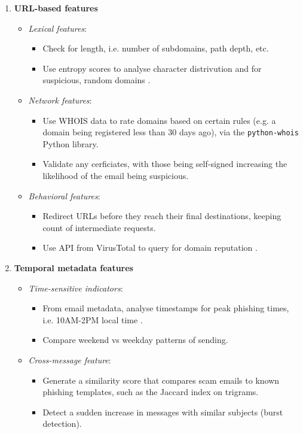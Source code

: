 \begin{enumerate}
\begin{itemize}
\begin{itemize}
    \end{itemize}
  \end{itemize}
  \item \textbf{URL-based features}
  \begin{itemize}
    \item \textit{Lexical features}:
    \begin{itemize}
      \item Check for length, i.e. number of subdomains, path depth, etc.
      \item Use entropy scores to analyse character distrivution and for suspicious, random domains \citep{palaniappan2020malicious}.
    \end{itemize}
    \item \textit{Network features}:
    \begin{itemize}
      \item Use WHOIS data to rate domains based on certain rules (e.g. a domain being registered less than 30 days ago), via the \texttt{python-whois} Python library.
      \item Validate any cerficiates, with those being self-signed increasing the likelihood of the email being suspicious.
    \end{itemize}
    \item \textit{Behavioral features}:
    \begin{itemize}
      \item Redirect URLs before they reach their final destinations, keeping count of intermediate requests.
      \item Use API from VirusTotal to query for domain reputation \citep{lin2021phishpedia}.
    \end{itemize}
  \end{itemize}
  \item \textbf{Temporal metadata features}
  \begin{itemize}
    \item \textit{Time-sensitive indicators}:
    \begin{itemize}
      \item From email metadata, analyse timestamps for peak phishing times, i.e. 10AM-2PM local time \citep{vishwanath2011people}.
      \item Compare weekend vs weekday patterns of sending.
    \end{itemize}
    \item \textit{Cross-message feature}:
    \begin{itemize}
      \item Generate a similarity score that compares scam emails to known phishing templates, such as the Jaccard index on trigrams.
      \item Detect a sudden increase in messages with similar subjects (burst detection).
    \end{itemize}
  \end{itemize}
\end{enumerate}


